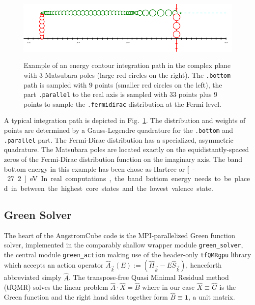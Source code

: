 \documentclass[oribibl]{llncs}
\newcommand{\ttt}[1]{\texttt{#1}}
\newcommand{\fullcodename}{AngstromCube}
\begin{document}
\begin{figure}[t]
	\centering
	\includegraphics[width=.99\textwidth]{fig/energy_contour-9-33-9-3}
	\label{fig:energy-contour}
	\caption{Example of an energy contour integration path in the complex plane with $3$ Matsubara poles (large red circles on the right).
	The \ttt{.bottom} path is sampled with $9$ points (smaller red circles on the left),
	the part \ttt{.parallel} to the real axis is sampled with $33$ points plus
	$9$ points to sample the \ttt{.fermidirac} distribution at the Fermi level.
	}
\end{figure}

\noindent
A typical integration path is depicted in Fig.~\ref{fig:energy-contour}. 
The distribution and weights of points are determined by a Gauss-Legendre quadrature for the \ttt{.bottom} and \ttt{.parallel} part.
The Fermi-Dirac distribution has a specialized, asymmetric quadrature.
The Matsubara poles are located exactly on the equidistantly-spaced zeros of the Fermi-Dirac distribution function on the imaginary axis.
The band bottom energy in this example has been chose as \unit[-1]{Hartree} or \unit[-27.2]{eV}.
In real computations, the band bottom energy needs to be placed in between the highest core states and the lowest valence state.

\subsection{Green Solver}\label{sec:green-solver}
The heart of the \fullcodename{} code is the \ac{MPI}-parallelized Green function solver,
implemented in the comparably shallow wrapper module \ttt{green\_solver}, 
the central module \ttt{green\_action} making use of the header-only \ttt{tfQMRgpu} library \cite{tfQMRgpu-preprint}
which accepts an action operator $\hat A_{\vec k}(E) := (\hat H_{\vec k} - E\hat S_{\vec k})$, henceforth abbreviated simply $\hat A$.
The transpose-free Quasi Minimal Residual method (tfQMR) solves the linear problem $\hat A \cdot \hat X = \hat B$ where in our case $\hat X \equiv \hat G$ is the Green function and the right hand sides together form $\hat B \equiv \mathbf{1}$, a unit matrix.
\end{document}
